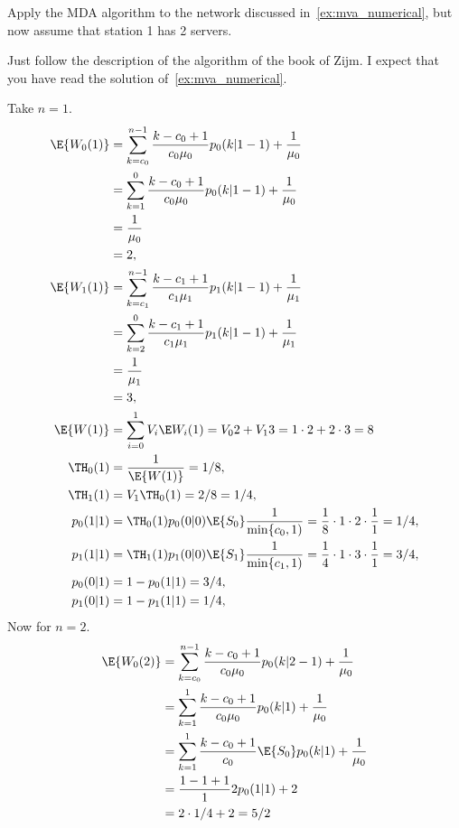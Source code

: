 \begin{exercise}
  Apply the MDA algorithm to the network discussed in~\cref{ex:mva_numerical}, but now assume that station 1 has 2 servers. 
\begin{hint}
  Just follow the description of the algorithm of the book of Zijm.
  I expect that you have read the solution of~\cref{ex:mva_numerical}.
\end{hint}
\begin{solution}
    Take $n=1$.
    \begin{align*}
      \E{W_0(1)} 
&= \sum_{k=c_0}^{n-1} \frac{k-c_0+1}{c_0 \mu_0} p_0(k|1-1) + \frac1{\mu_0} \\
&= \sum_{k=1}^{0} \frac{k-c_0+1}{c_0 \mu_0} p_0(k|1-1) + \frac1{\mu_0} \\
&= \frac1{\mu_0} \\
&= 2, \\
      \E{W_1(1)}
&= \sum_{k=c_1}^{n-1} \frac{k-c_1+1}{c_1 \mu_1} p_1(k|1-1) + \frac1{\mu_1} \\
&= \sum_{k=2}^{0} \frac{k-c_1+1}{c_1 \mu_1} p_1(k|1-1) + \frac1{\mu_1} \\
&= \frac1{\mu_1} \\
&= 3, \\
\E{W(1)} &= \sum_{i=0}^1 V_i \E W_i(1) = V_0 2 + V_1  3 = 1\cdot 2 + 2 \cdot 3 = 8\\
\TH_0(1) &= \frac{1}{\E{W(1)}} = 1/8, \\
\TH_1(1) &= V_1 \TH_0(1) = 2/8=1/4, \\
p_0(1|1) 
&= \TH_0(1)p_0(0|0)\E{S_0} \frac1{\min\{c_0,1)} = \frac18\cdot 1\cdot 2 \cdot \frac{1}{1}=1/4, \\ 
p_1(1|1) 
&= \TH_1(1)p_1(0|0)\E{S_1} \frac1{\min\{c_1,1)} = \frac14\cdot 1\cdot 3 \cdot \frac{1}{1}=3/4, \\
p_0(0|1) &= 1-p_0(1|1) = 3/4, \\
p_1(0|1) &= 1-p_1(1|1) = 1/4, \\
    \end{align*}
Now for $n=2$.
    \begin{align*}
      \E{W_0(2)}
&= \sum_{k=c_0}^{n-1} \frac{k-c_0+1}{c_0 \mu_0} p_0(k|2-1) + \frac1{\mu_0} \\
&= \sum_{k=1}^{1} \frac{k-c_0+1}{c_0 \mu_0} p_0(k|1) + \frac1{\mu_0} \\
&= \sum_{k=1}^{1} \frac{k-c_0+1}{c_0 }\E{S_0} p_0(k|1) + \frac1{\mu_0} \\
&=  \frac{1-1+1}{1 }2 p_0(1|1) + 2 \\
&=  2\cdot 1/4 + 2 =5/2\\

\end{align*}
\end{solution}
\end{exercise}

